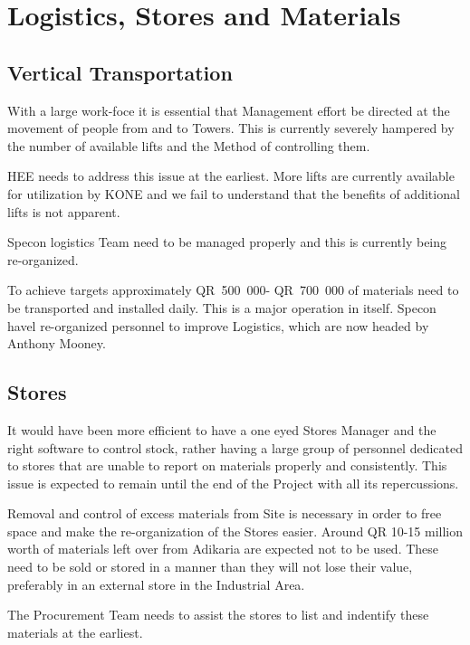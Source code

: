 \chapter{Logistics, Stores and Materials}




\section{Vertical Transportation}\label{sec:logistics}
With a large work-foce it is essential that Management effort be directed at the movement of people from and to Towers. This is currently severely hampered by the number of available lifts and the Method of controlling them.

HEE needs to address this issue at the earliest. More lifts are currently available for utilization by KONE and we fail to understand that the benefits of additional lifts is not apparent. 

Specon logistics Team need to be managed properly and this is currently being re-organized.

To achieve targets approximately QR~500~000- QR~700~000 of materials need to be transported and installed daily. This is a major operation in itself. Specon havel re-organized personnel to improve Logistics, which are now headed by Anthony Mooney. 

\section{Stores}
It would have been more efficient to have a one eyed Stores Manager and the right software to control stock, rather having a large group of personnel dedicated to stores that are unable to report on materials properly and consistently. This issue is expected to remain until the end of the Project with all its repercussions.

Removal and control of excess materials from Site is necessary in order to free space and make the re-organization of the Stores easier. Around QR 10-15 million worth of materials left over from Adikaria are expected  not to be used. These need to be sold or stored in a manner than they will not lose their value, preferably in an external store in the Industrial Area. 

The Procurement Team needs to assist the stores to list and indentify these materials at the earliest.
